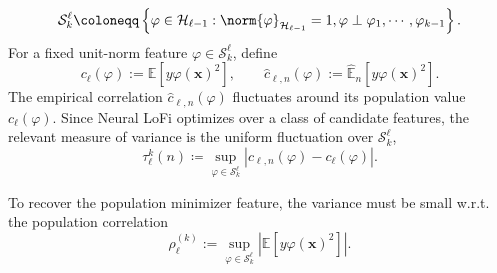 \begin{equation}
  \mathcal{S}^\ell_{k}
  \coloneqq
  \left\{
  \varphi\in\mathcal H_{\ell-1}:
  \norm{\varphi}_{\mathcal H_{\ell-1}}=1, 
  \varphi \perp \varphi_1,\cdots, \varphi_{k-1}
  \right\}.
  \label{2605:eq:lofi-candidate-class}
\end{equation}
For a fixed unit-norm feature
$\varphi\in \mathcal{S}^\ell_{k}$, define
\begin{equation}
    c_\ell(\varphi)
    :=
    \mathbb E\left[y \varphi(\bm x)^2\right],
    \qquad
    \widehat c_{\ell,n}(\varphi)
    :=
    \widehat{\mathbb E}_n\left[y \varphi(\bm x)^2\right].
\end{equation}
The empirical correlation $\widehat c_{\ell,n}(\varphi)$ fluctuates around its population value
$c_\ell(\varphi)$. Since Neural LoFi optimizes over a class of candidate features, the relevant measure of variance is the uniform fluctuation over $\mathcal{S}^\ell_{k}$,
\begin{equation}
\tau^k_\ell(n)
\coloneqq
\sup_{\varphi \in  \mathcal{S}^\ell_{k}}
\left|
\widehat c_{\ell,n}(\varphi)-c_\ell(\varphi)
\right|.
\end{equation}

To recover the population minimizer feature, the variance must be small w.r.t. the population correlation
\begin{equation}
\rho_\ell^{(k)}
    :=
    \sup_{\varphi \in  \mathcal{S}^\ell_{k}}
    \left|
    \mathbb E\left[y \varphi(\bm x)^2\right]
    \right|.
\end{equation}

